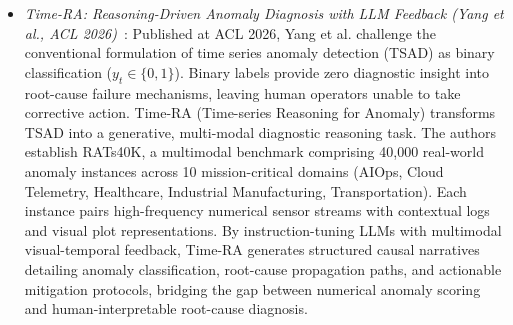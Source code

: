 \begin{itemize}[leftmargin=*]
    \item \emph{Time-RA: Reasoning-Driven Anomaly Diagnosis with LLM Feedback (Yang et al., ACL 2026)}~\cite{yang2026timera}: Published at ACL 2026, Yang et al. challenge the conventional formulation of time series anomaly detection (TSAD) as binary classification ($y_t \in \{0, 1\}$). Binary labels provide zero diagnostic insight into root-cause failure mechanisms, leaving human operators unable to take corrective action. Time-RA (Time-series Reasoning for Anomaly) transforms TSAD into a generative, multi-modal diagnostic reasoning task. The authors establish RATs40K, a multimodal benchmark comprising 40,000 real-world anomaly instances across 10 mission-critical domains (AIOps, Cloud Telemetry, Healthcare, Industrial Manufacturing, Transportation). Each instance pairs high-frequency numerical sensor streams with contextual logs and visual plot representations. By instruction-tuning LLMs with multimodal visual-temporal feedback, Time-RA generates structured causal narratives detailing anomaly classification, root-cause propagation paths, and actionable mitigation protocols, bridging the gap between numerical anomaly scoring and human-interpretable root-cause diagnosis.
\end{itemize}

